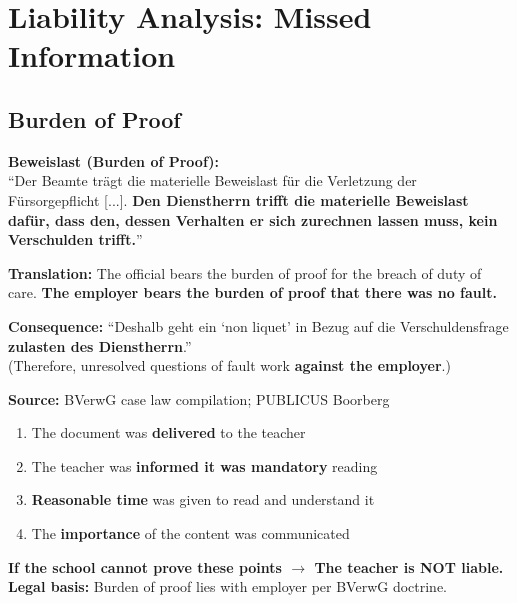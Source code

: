 \documentclass[11pt,a4paper]{article}
\begin{document}
\section{Liability Analysis: Missed Information}

\subsection{Burden of Proof}

\begin{sourcebox}
\textbf{Beweislast (Burden of Proof):}\\
``Der Beamte trägt die materielle Beweislast für die Verletzung der Fürsorgepflicht [...]. \textbf{Den Dienstherrn trifft die materielle Beweislast dafür, dass den, dessen Verhalten er sich zurechnen lassen muss, kein Verschulden trifft.}''

\textbf{Translation:} The official bears the burden of proof for the breach of duty of care. \textbf{The employer bears the burden of proof that there was no fault.}

\textbf{Consequence:} ``Deshalb geht ein `non liquet' in Bezug auf die Verschuldensfrage \textbf{zulasten des Dienstherrn}.''\\
(Therefore, unresolved questions of fault work \textbf{against the employer}.)

\textbf{Source:} BVerwG case law compilation; PUBLICUS Boorberg
\end{sourcebox}

\begin{warningbox}
\begin{enumerate}[nosep]
    \item The document was \textbf{delivered} to the teacher
    \item The teacher was \textbf{informed it was mandatory} reading
    \item \textbf{Reasonable time} was given to read and understand it
    \item The \textbf{importance} of the content was communicated
\end{enumerate}
\textbf{If the school cannot prove these points $\rightarrow$ The teacher is NOT liable.}\\
\textbf{Legal basis:} Burden of proof lies with employer per BVerwG doctrine.
\end{warningbox}
\end{document}
